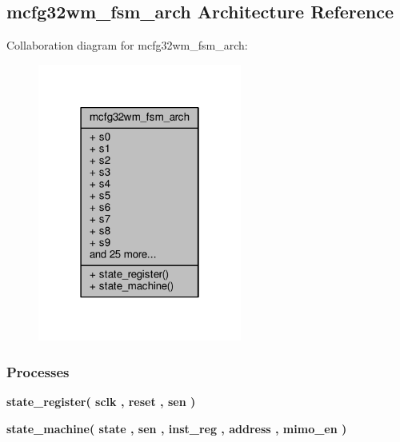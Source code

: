 \subsection{mcfg32wm\+\_\+fsm\+\_\+arch Architecture Reference}
\label{classmcfg32wm__fsm_1_1mcfg32wm__fsm__arch}


Collaboration diagram for mcfg32wm\+\_\+fsm\+\_\+arch\+:\nopagebreak
\begin{figure}[H]
\begin{center}
\leavevmode
\includegraphics[width=190pt]{da/dad/classmcfg32wm__fsm_1_1mcfg32wm__fsm__arch__coll__graph}
\end{center}
\end{figure}
\subsubsection*{Processes}
 \begin{DoxyCompactItemize}
\item 
{\bf state\+\_\+register}{\bfseries  ( {\bfseries {\bfseries {\bf sclk}} \textcolor{vhdlchar}{ }} , {\bfseries {\bfseries {\bf reset}} \textcolor{vhdlchar}{ }} , {\bfseries {\bfseries {\bf sen}} \textcolor{vhdlchar}{ }} )}
\item 
{\bf state\+\_\+machine}{\bfseries  ( {\bfseries {\bfseries {\bf state}} \textcolor{vhdlchar}{ }} , {\bfseries {\bfseries {\bf sen}} \textcolor{vhdlchar}{ }} , {\bfseries {\bfseries {\bf inst\+\_\+reg}} \textcolor{vhdlchar}{ }} , {\bfseries {\bfseries {\bf address}} \textcolor{vhdlchar}{ }} , {\bfseries {\bfseries {\bf mimo\+\_\+en}} \textcolor{vhdlchar}{ }} )}
\end{DoxyCompactItemize}
